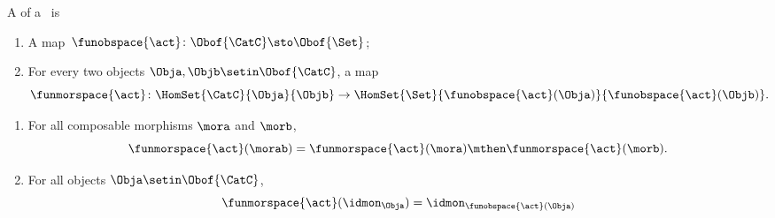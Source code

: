 \begin{ctdefinition}
    \label{def:category-action}
    A  of a ~\CatC is

    \constit
    \begin{enumerate}
        \item A map~$\funobspace{\act} \colon \Obof{\CatC} \sto \Obof{\Set}$;
        \item For every two objects $\Obja, \Objb \setin \Obof{\CatC}$, a map
              \begin{equation}
                  \funmorspace{\act} \colon \HomSet{\CatC}{\Obja}{\Objb} \to \HomSet{\Set}{ \funobspace{\act}(\Obja)}{\funobspace{\act}(\Objb)}.
              \end{equation}
    \end{enumerate}

    \condit

    \begin{enumerate}
        \item For all composable morphisms $\mora$ and $\morb$,
              \begin{equation}
                  \funmorspace{\act}(\morab) = \funmorspace{\act}(\mora) \mthen \funmorspace{\act}(\morb).
              \end{equation}
        \item For all objects $\Obja \setin \Obof{\CatC}$,
              \begin{equation}
                  \funmorspace{\act}(\idmon_\Obja) = \idmon_{\funobspace{\act}(\Obja)}
              \end{equation}
    \end{enumerate}
\end{ctdefinition}

